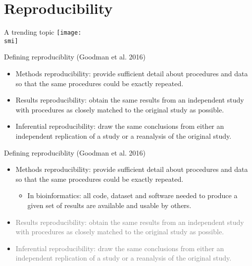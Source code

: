 \documentclass[10pt]{beamer}
\def\smi{out/ln/updir/mw-gcthesis-oral/library.bib}
\begin{document}
    \section{Reproducibility}
    \begin{frame}{A trending topic}
      \def\smi{out/ln/updir/mw-gcthesis-oral/ink/reproducibility/pubmed_trend_reproducibility_crisis.pdf}
      \texttt{[image: \\smi]}%
    \end{frame}
    \begin{frame}{Defining reproduciblity}
      (Goodman et al. 2016)
      \begin{itemize}
        \item Methods reproducibility: provide sufficient detail about procedures and data so that the same procedures could be exactly repeated.
        \item Results reproducibility: obtain the same results from an independent study with procedures as closely matched to the original study as possible.
        \item Inferential reproducibility: draw the same conclusions from either an independent replication of a study or a reanalysis of the original study.
      \end{itemize}
    \end{frame}
    \begin{frame}{Defining reproduciblity}
      (Goodman et al. 2016)
      \begin{itemize}
        \item Methods reproducibility: provide sufficient detail about procedures and data so that the same procedures could be exactly repeated.
          \begin{itemize}
            \item In bioinformatics: all code, dataset and software needed to produce a given set of results are available and usable by others.
          \end{itemize}
        \item \textcolor{gray}{Results reproducibility: obtain the same results from an independent study with procedures as closely matched to the original study as possible.}
        \item \textcolor{gray}{Inferential reproducibility: draw the same conclusions from either an independent replication of a study or a reanalysis of the original study.}
      \end{itemize}
    \end{frame}
\end{document}
